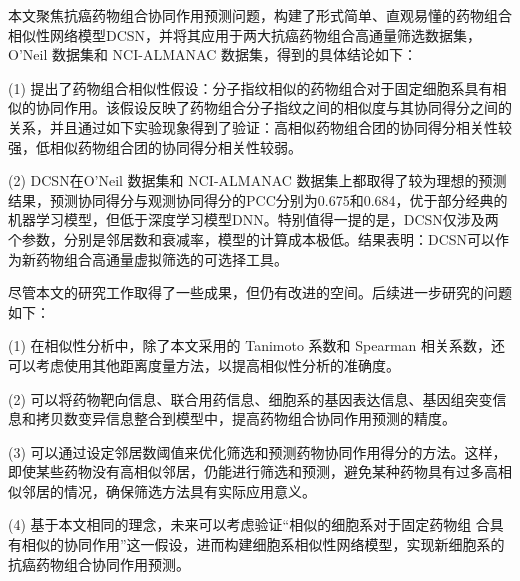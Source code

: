 \begin{conclusion}
\label{chap:conclusion}

本文聚焦抗癌药物组合协同作用预测问题，构建了形式简单、直观易懂的药物组合相似性网络模型DCSN，并将其应用于两大抗癌药物组合高通量筛选数据集，O'Neil 数据集和 NCI-ALMANAC 数据集，得到的具体结论如下： 

(1) 提出了药物组合相似性假设：分子指纹相似的药物组合对于固定细胞系具有相似的协同作用。该假设反映了药物组合分子指纹之间的相似度与其协同得分之间的关系，并且通过如下实验现象得到了验证：高相似药物组合团的协同得分相关性较强，低相似药物组合团的协同得分相关性较弱。 

(2) DCSN在O'Neil 数据集和 NCI-ALMANAC 数据集上都取得了较为理想的预测结果，预测协同得分与观测协同得分的PCC分别为0.675和0.684，优于部分经典的机器学习模型，但低于深度学习模型DNN。特别值得一提的是，DCSN仅涉及两个参数，分别是邻居数和衰减率，模型的计算成本极低。结果表明：DCSN可以作为新药物组合高通量虚拟筛选的可选择工具。 

尽管本文的研究工作取得了一些成果，但仍有改进的空间。后续进一步研究的问题如下：

(1) 在相似性分析中，除了本文采用的 Tanimoto 系数和 Spearman 相关系数，还可以考虑使用其他距离度量方法，以提高相似性分析的准确度。

(2) 可以将药物靶向信息、联合用药信息、细胞系的基因表达信息、基因组突变信息和拷贝数变异信息整合到模型中，提高药物组合协同作用预测的精度。

(3) 可以通过设定邻居数阈值来优化筛选和预测药物协同作用得分的方法。这样，即使某些药物没有高相似邻居，仍能进行筛选和预测，避免某种药物具有过多高相似邻居的情况，确保筛选方法具有实际应用意义。

(4) 基于本文相同的理念，未来可以考虑验证“相似的细胞系对于固定药物组 合具有相似的协同作用”这一假设，进而构建细胞系相似性网络模型，实现新细胞系的抗癌药物组合协同作用预测。

\end{conclusion}